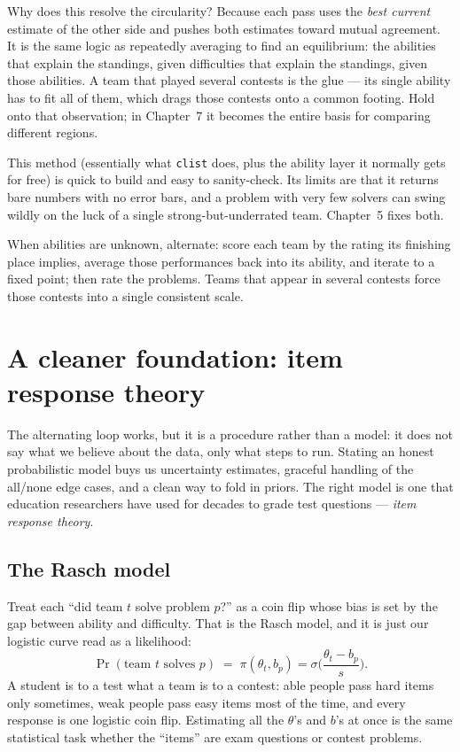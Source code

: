 \documentclass[11pt]{report}
\theoremstyle{definition}
\numberwithin{equation}{chapter}
\begin{document}
\begin{intuition}
Why does this resolve the circularity? Because each pass uses the \emph{best
current} estimate of the other side and pushes both estimates toward mutual
agreement. It is the same logic as repeatedly averaging to find an equilibrium:
the abilities that explain the standings, given difficulties that explain the
standings, given those abilities. A team that played several contests is the glue
--- its single ability has to fit all of them, which drags those contests onto a
common footing. Hold onto that observation; in Chapter~7 it becomes the entire
basis for comparing different regions.
\end{intuition}

This method (essentially what \texttt{clist} does, plus the ability layer it
normally gets for free) is quick to build and easy to sanity-check. Its limits
are that it returns bare numbers with no error bars, and a problem with very few
solvers can swing wildly on the luck of a single strong-but-underrated team.
Chapter~5 fixes both.

\begin{takeaway}
When abilities are unknown, alternate: score each team by the rating its finishing
place implies, average those performances back into its ability, and iterate to a
fixed point; then rate the problems. Teams that appear in several contests force
those contests into a single consistent scale.
\end{takeaway}

\chapter{A cleaner foundation: item response theory}

The alternating loop works, but it is a procedure rather than a model: it does
not say what we believe about the data, only what steps to run. Stating an honest
probabilistic model buys us uncertainty estimates, graceful handling of the
all/none edge cases, and a clean way to fold in priors. The right model is one
that education researchers have used for decades to grade test questions ---
\emph{item response theory}.

\section{The Rasch model}

Treat each ``did team $t$ solve problem $p$?'' as a coin flip whose bias is set by
the gap between ability and difficulty. That is the Rasch model, and it is just
our logistic curve read as a likelihood:
\begin{equation}\label{eq:rasch}
  \Pr(\text{team }t\text{ solves }p)\;=\;\pi(\theta_t,b_p)
  =\sigma\!\Big(\frac{\theta_t-b_p}{s}\Big).
\end{equation}
A student is to a test what a team is to a contest: able people pass hard items
only sometimes, weak people pass easy items most of the time, and every response
is one logistic coin flip. Estimating all the $\theta$'s and $b$'s at once is the
same statistical task whether the ``items'' are exam questions or contest
problems.
\end{document}
